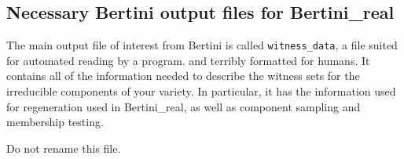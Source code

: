 \subsection{Necessary Bertini output files for Bertini\_real}

The main output file of interest from Bertini is called \texttt{witness\_data}, a file suited for automated reading by a program. and terribly formatted for humans. It contains all of the information needed to describe the witness sets for the irreducible components of your variety. In particular, it has the information used for regeneration used in Bertini\_real, as well as component sampling and membership testing.

Do not rename this file.
